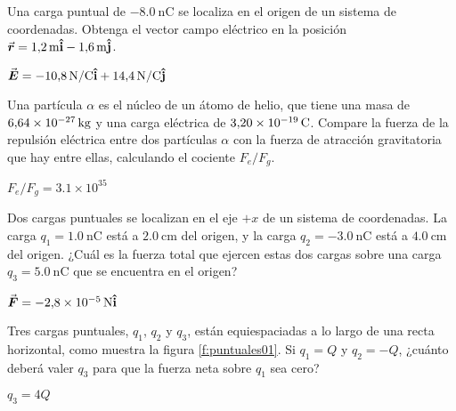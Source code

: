 
\setcounter{figure}{0}

\begin{Exercise}
  Una carga puntual de $\SI{-8.0}{\nano\coulomb}$ se localiza en el origen de un sistema de coordenadas. Obtenga el vector campo eléctrico en la posición $\va*{r} = \SI{1.2}{\metre}\vu{i} - \SI{1.6}{\metre}\vu{j}$.
\end{Exercise}
\begin{Answer}
  $\va*{E} = \SI{-10.8}{\newton/\coulomb}\vu{i} + \SI{14.4}{\newton/\coulomb}\vu{j}$
\end{Answer}
%
\begin{Exercise}
Una partícula $\alpha$ es el núcleo de un átomo de helio, que tiene una masa de $\SI{6.64E-27}{\kilogram}$ y una carga eléctrica de $\SI{3.20E-19}{\coulomb}$. Compare la fuerza de la repulsión eléctrica entre dos partículas $\alpha$ con la fuerza de atracción gravitatoria que hay entre ellas, calculando el cociente $F_e/F_g$.
\end{Exercise}
\begin{Answer}
  $F_e/F_g = 3.1\times 10^{35}$
\end{Answer}
%
\begin{Exercise}
Dos cargas puntuales se localizan en el eje $+x$ de un sistema de coordenadas. La carga $q_1 = \SI{1.0}{\nano\coulomb}$ está a $\SI{2.0}{\centi\metre}$ del origen, y la carga $q_2 = \SI{-3.0}{\nano\coulomb}$ está a $\SI{4.0}{\centi\metre}$ del origen. ¿Cuál es la fuerza total que ejercen estas dos cargas sobre una carga $q_3 = \SI{5.0}{\nano\coulomb}$ que se encuentra en el origen?
\end{Exercise}
\begin{Answer}
  $\va*{F} = \SI{-2.8E-5}{\newton}\vu{i}$
\end{Answer}
%
\begin{Exercise}\label{p:puntuales01}
  Tres cargas puntuales, $q_1$, $q_2$ y $q_3$, están equiespaciadas a lo largo de una recta horizontal, como muestra la figura \ref{f:puntuales01}. Si $q_1 = Q$ y $q_2 = -Q$, ¿cuánto deberá valer $q_3$ para que la fuerza neta sobre $q_1$ sea cero?
\end{Exercise}
\begin{Answer}
  $q_3 = 4Q$
\end{Answer}
